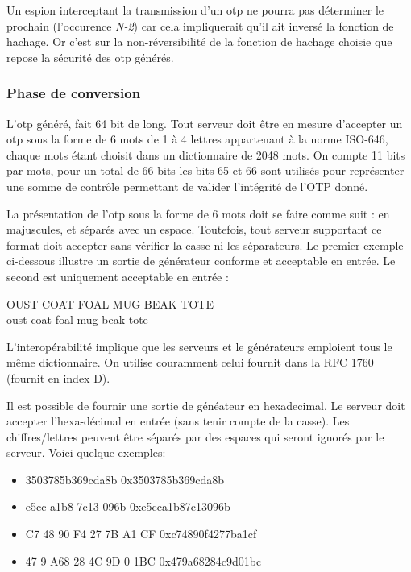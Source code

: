 \documentclass{../res/univ-projet}
\begin{document}
      Un espion interceptant la transmission d'un otp ne pourra pas déterminer 
le prochain (l'occurence \emph{N-2}) car cela impliquerait qu'il ait inversé la 
fonction de hachage. Or c'est sur la non-réversibilité de la fonction de 
hachage choisie que repose la sécurité des otp générés.\\



    \subsubsection{Phase de conversion}
        L'otp généré, fait 64 bit de long. Tout serveur doit être en mesure 
d'accepter un otp sous la forme de 6 mots de 1 à 4 lettres appartenant à la 
norme ISO-646, chaque mots étant choisit dans un dictionnaire de 2048 mots. On compte 
11 bits par mots, pour un total de 66 bits les bits 65 et 66 sont utilisés pour représenter 
une somme de contrôle permettant de valider l'intégrité de l'OTP donné.

        La présentation de l'otp sous la forme de 6 mots doit se faire comme 
suit : en majuscules, et séparés avec un espace. Toutefois, tout serveur 
supportant ce format doit accepter sans vérifier la casse ni les séparateurs. 
Le 
premier exemple ci-dessous illustre un sortie de générateur conforme et 
acceptable en entrée. Le second est uniquement acceptable en entrée :
        \begin{center}
            OUST COAT FOAL MUG BEAK TOTE\\
            oust coat foal mug beak tote
        \end{center}

        L'interopérabilité implique que les serveurs et le générateurs 
emploient tous le même dictionnaire. On utilise couramment celui fournit dans la RFC 1760 
(fournit en index D).

        Il est possible de fournir une sortie de généateur en hexadecimal. Le 
serveur doit accepter l'hexa-décimal en entrée (sans tenir compte de la casse). 
Les chiffres/lettres peuvent être séparés par des espaces qui seront ignorés 
par le serveur. Voici quelque exemples:
        \begin{itemize}
            \item 3503785b369cda8b              0x3503785b369cda8b
            \item e5cc a1b8 7c13 096b           0xe5cca1b87c13096b
            \item C7 48 90 F4 27 7B A1 CF       0xc74890f4277ba1cf
            \item 47 9 A68 28 4C 9D 0 1BC       0x479a68284c9d01bc
        \end{itemize}
\end{document}
